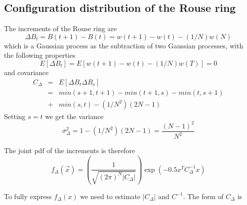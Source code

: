 \documentclass{report}
\begin{document}
\subsection{Configuration distribution of the Rouse ring}\label{subsection_configurationDistributionRouseRing}

The increments of the Rouse ring are
\begin{equation*}
\Delta B_t= B(t+1)-B(t)=w(t+1)-w(t)-(1/N)w(N)
\end{equation*}
which is a Gaussian process as the subtraction of two Gaussian processes, with the following properties
\begin{equation*}
E[\Delta B_t]=E[w(t+1)-w(t)-(1/N)w(T)]=0
\end{equation*}
and covariance
 \begin{eqnarray*}
 C_{\Delta} & = & E[\Delta B_t \Delta B_s]\\
  & = & min(s+1,t+1)-min(t+1,s)-min(t,s+1)\\
  &+ & min(s,t)-(1/N^2)(2N-1)
 \end{eqnarray*}
Setting $s=t $ we get the variance 
\begin{equation*}
\sigma^2_{\Delta}=1-(1/N^2)(2N-1)=\frac{(N-1)^2}{N^2}
\end{equation*}

The joint pdf of the increments is therefore 
\begin{equation*}
f_\Delta(\vec{x}) = \left(\frac{1}{\sqrt{(2\pi)^N |C_\Delta|}}\right)\exp(-0.5x^TC_\Delta^{-1}x)
\end{equation*}

To fully express $f_\Delta(x)$ we need to estimate $|C_\Delta|$ and $C^{-1}$. The form of $C_\Delta$ is 
\end{document}
